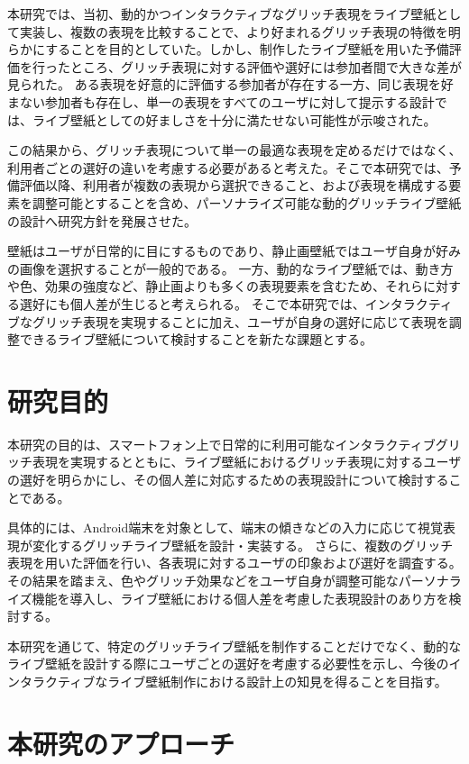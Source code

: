 本研究では、当初、動的かつインタラクティブなグリッチ表現をライブ壁紙として実装し、複数の表現を比較することで、より好まれるグリッチ表現の特徴を明らかにすることを目的としていた。しかし、制作したライブ壁紙を用いた予備評価を行ったところ、グリッチ表現に対する評価や選好には参加者間で大きな差が見られた。
ある表現を好意的に評価する参加者が存在する一方、同じ表現を好まない参加者も存在し、単一の表現をすべてのユーザに対して提示する設計では、ライブ壁紙としての好ましさを十分に満たせない可能性が示唆された。

この結果から、グリッチ表現について単一の最適な表現を定めるだけではなく、利用者ごとの選好の違いを考慮する必要があると考えた。そこで本研究では、予備評価以降、利用者が複数の表現から選択できること、および表現を構成する要素を調整可能とすることを含め、パーソナライズ可能な動的グリッチライブ壁紙の設計へ研究方針を発展させた。

壁紙はユーザが日常的に目にするものであり、静止画壁紙ではユーザ自身が好みの画像を選択することが一般的である。
一方、動的なライブ壁紙では、動き方や色、効果の強度など、静止画よりも多くの表現要素を含むため、それらに対する選好にも個人差が生じると考えられる。
そこで本研究では、インタラクティブなグリッチ表現を実現することに加え、ユーザが自身の選好に応じて表現を調整できるライブ壁紙について検討することを新たな課題とする。


\section{研究目的}

本研究の目的は、スマートフォン上で日常的に利用可能なインタラクティブグリッチ表現を実現するとともに、ライブ壁紙におけるグリッチ表現に対するユーザの選好を明らかにし、その個人差に対応するための表現設計について検討することである。

具体的には、Android端末を対象として、端末の傾きなどの入力に応じて視覚表現が変化するグリッチライブ壁紙を設計・実装する。
さらに、複数のグリッチ表現を用いた評価を行い、各表現に対するユーザの印象および選好を調査する。
その結果を踏まえ、色やグリッチ効果などをユーザ自身が調整可能なパーソナライズ機能を導入し、ライブ壁紙における個人差を考慮した表現設計のあり方を検討する。

本研究を通じて、特定のグリッチライブ壁紙を制作することだけでなく、動的なライブ壁紙を設計する際にユーザごとの選好を考慮する必要性を示し、今後のインタラクティブなライブ壁紙制作における設計上の知見を得ることを目指す。


\section{本研究のアプローチ}

